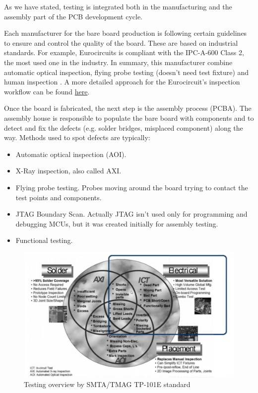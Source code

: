 \documentclass[final]{cubedoc}
\begin{document}
	As we have stated, testing is integrated both in the manufacturing and the assembly part of the PCB development cycle.
	
	Each manufacturer for the bare board production is following certain guidelines to ensure and control the quality of the board. These are based on industrial standards. For example, Eurocircuits is compliant with the IPC-A-600 Class 2, the most used one in the industry. In summary, this manufacturer combine  automatic optical inspection, flying probe testing (doesn't need test fixture) and human inspection \cite{eurocircuits:stepbystep}. A more detailed approach for the Eurocircuit's inspection workflow can be found \href{https://web.archive.org/web/20200814201544/https://www.eurocircuits.com/blog/how-do-we-assure-the-quality-of-your-pcb-part-1/}{here}.
	
	Once the board is fabricated, the next step is the assembly process (PCBA). The assembly house is responsible to populate the bare board with components and to detect and fix the defects (e.g. solder bridges, misplaced component) along the way. Methods used to spot defects are typically:
	\begin{itemize}
		\item Automatic optical inspection (AOI).
		\item X-Ray inspection, also called AXI.
		\item Flying probe testing. Probes moving around the board trying to contact the test points and components.
		\item JTAG Boundary Scan. Actually JTAG isn't used only for programming and debugging MCUs, but it was created initially for assembly testing.
		\item Functional testing. 
	\end{itemize} 
	
	\begin{figure}[h!]
		\centering
		\includegraphics[keepaspectratio, width = \textwidth, height=.4\textheight]{assets/testing_overview.png}
		\caption{Testing overview by SMTA/TMAG TP-101E standard}
	\end{figure}
	
\end{document}
